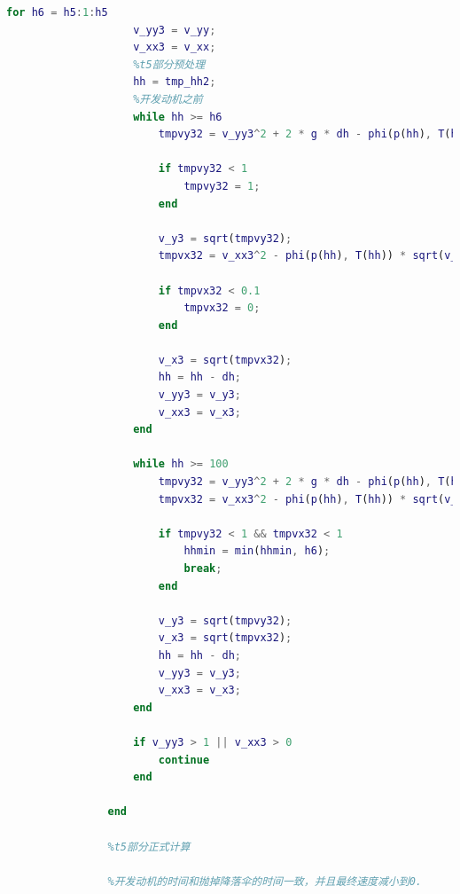 \documentclass[hyperref,a4paper,UTF8]{ctexart}
\begin{document}
\begin{lstlisting}[language=Matlab]
                for h6 = h5:1:h5
                    v_yy3 = v_yy;
                    v_xx3 = v_xx;
                    %t5部分预处理
                    hh = tmp_hh2;
                    %开发动机之前
                    while hh >= h6
                        tmpvy32 = v_yy3^2 + 2 * g * dh - phi(p(hh), T(hh)) * sqrt(v_yy3^2 + v_xx3^2) * (S_floor + S_para) * dh * v_yy3 / (m - m_floor - m_para - m_hide);

                        if tmpvy32 < 1
                            tmpvy32 = 1;
                        end

                        v_y3 = sqrt(tmpvy32);
                        tmpvx32 = v_xx3^2 - phi(p(hh), T(hh)) * sqrt(v_xx3^2 + v_yy3^2) * (S_floor + S_para) * dh * v_xx3^2 / ((m - m_floor - m_para - m_hide) * v_yy3);

                        if tmpvx32 < 0.1
                            tmpvx32 = 0;
                        end

                        v_x3 = sqrt(tmpvx32);
                        hh = hh - dh;
                        v_yy3 = v_y3;
                        v_xx3 = v_x3;
                    end

                    while hh >= 100
                        tmpvy32 = v_yy3^2 + 2 * g * dh - phi(p(hh), T(hh)) * sqrt(v_yy3^2 + v_xx3^2) * S_floor * dh * v_yy3 / (m - m_floor - m_para - m_hide) - 2 * 7500 * dh * v_yy3 / ((m - m_floor - m_para - m_hide) * sqrt(v_yy3^2 + v_xx3^2));
                        tmpvx32 = v_xx3^2 - phi(p(hh), T(hh)) * sqrt(v_yy3^2 + v_xx3^2) * S_floor * dh * v_xx3^2 / (v_yy3 * (m - m_floor - m_para - m_hide)) - 2 * 7500 * dh * v_xx3^2 / (v_yy3 * sqrt(v_yy3^2 + v_xx3^2) * (m - m_floor - m_para - m_hide));

                        if tmpvy32 < 1 && tmpvx32 < 1
                            hhmin = min(hhmin, h6);
                            break;
                        end

                        v_y3 = sqrt(tmpvy32);
                        v_x3 = sqrt(tmpvx32);
                        hh = hh - dh;
                        v_yy3 = v_y3;
                        v_xx3 = v_x3;
                    end

                    if v_yy3 > 1 || v_xx3 > 0
                        continue
                    end

                end

                %t5部分正式计算

                %开发动机的时间和抛掉降落伞的时间一致，并且最终速度减小到0.


\end{lstlisting}
\end{document}
